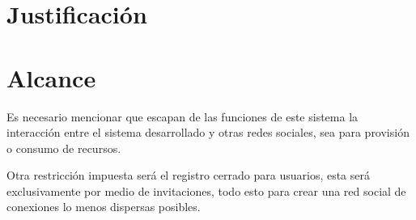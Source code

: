 \section{Justificación}

\section{Alcance}
Es necesario mencionar que escapan de las funciones de este sistema la
interacción entre el sistema desarrollado y otras redes sociales, sea para
provisión o consumo de recursos.

Otra restricción impuesta será el registro cerrado para usuarios, esta será
exclusivamente por medio de invitaciones, todo esto para crear una red social
de conexiones lo menos dispersas posibles.

